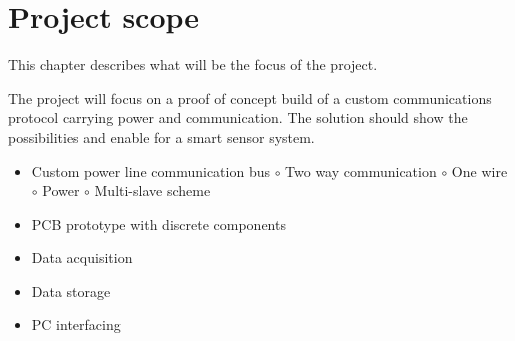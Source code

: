 \chapter{Project scope}

This chapter describes what will be the focus of the project.

The project will focus on a proof of concept build of a custom communications protocol carrying power and communication. The solution should show the possibilities and enable for a smart sensor system.\\
\begin{itemize}
	\item Custom power line communication bus 
	\subitem $\circ$ Two way communication
	\subitem $\circ$ One wire
	\subitem $\circ$ Power
	\subitem $\circ$ Multi-slave scheme
	\item PCB prototype with discrete components
	\item Data acquisition
	\item Data storage
	\item PC interfacing
\end{itemize}
